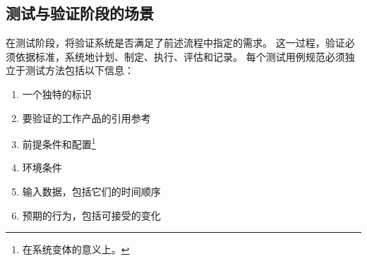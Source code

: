 \subsection{测试与验证阶段的场景}
在测试阶段，将验证系统是否满足了前述流程中指定的需求。
这一过程，验证必须依据标准\cite[part 8, section 9.2]{ISO_26262_2011}，系统地计划、制定、执行、评估和记录。
每个测试用例规范必须独立于测试方法包括以下信息\cite[part 8, section 9.4.2]{ISO_26262_2011}：
\begin{enumerate}
\item  一个独特的标识
\item 要验证的工作产品的引用参考
\item 前提条件和配置\footnote{在系统变体的意义上。}
\item 环境条件
\item 输入数据，包括它们的时间顺序
\item 预期的行为，包括可接受的变化
\end{enumerate}

